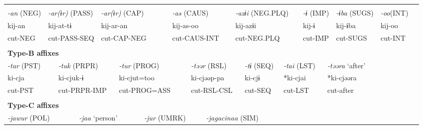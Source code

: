 \tabletail{}
\tablelasttail{}
\begin{tabularx}{\textwidth}{XXXXXXXXXXXXXXXXXXXXXX}
\lsptoprule
\multicolumn{22}{X}{{\bfseries Type-A affixes}}\\
{ \textit{{}-an} (NEG)} & \multicolumn{4}{X}{{ \textit{{}-ar(ɨr)} (PASS)}} & \multicolumn{4}{X}{{ \textit{{}-ar(ɨr)} (CAP)}} & \multicolumn{4}{X}{{ \textit{{}-as} (CAUS)}} & \multicolumn{4}{X}{{ \textit{{}-azɨi} (NEG.PLQ)}} & \multicolumn{2}{X}{{ \textit{{}-ɨ} (IMP)}} & { \textit{{}-ɨba} (SUGS)} & { \textit{{}-oo}(INT)} & \\
{ kij-an} & \multicolumn{4}{X}{{ kij-at-tɨ}} & \multicolumn{4}{X}{{ kij-ar-an}} & \multicolumn{4}{X}{{ kij-as-oo}} & \multicolumn{4}{X}{{ kij-azɨi}} & \multicolumn{2}{X}{{ kij-ɨ}} & { kij-ɨba} & { kij-oo} & \\
cut-NEG & \multicolumn{4}{X}{cut-PASS-SEQ} & \multicolumn{4}{X}{cut-CAP-NEG} & \multicolumn{4}{X}{cut-CAUS-INT} & \multicolumn{4}{X}{cut-NEG.PLQ} & \multicolumn{2}{X}{cut-IMP} & cut-SUGS & cut-INT & \\
\multicolumn{22}{X}{}\\
\multicolumn{22}{X}{{\bfseries Type-B affixes}}\\
\multicolumn{2}{X}{{ \textit{{}-tar} (PST)}} & \multicolumn{4}{X}{{ \textit{{}-tuk} (PRPR)}} & \multicolumn{4}{X}{{ \textit{{}-tur} (PROG)}} & \multicolumn{4}{X}{{ \textit{{}-təər} (RSL)}} & \multicolumn{2}{X}{{ \textit{{}-tɨ} (SEQ)}} & \multicolumn{2}{X}{{ \textit{{}-tai} (LST)}} & \multicolumn{4}{X}{{ \textit{{}-təəra} ‘after’}}\\
\multicolumn{2}{X}{{ ki-cja}} & \multicolumn{4}{X}{{ ki-cjuk-ɨ}} & \multicolumn{4}{X}{{ ki-cjut=too}} & \multicolumn{4}{X}{{ ki-cjəəp-pa}} & \multicolumn{2}{X}{{ ki-cjɨ}} & \multicolumn{2}{X}{{ *ki-cjai}} & \multicolumn{4}{X}{{ *ki-cjəəra}}\\
\multicolumn{2}{X}{cut-PST} & \multicolumn{4}{X}{cut-PRPR-IMP} & \multicolumn{4}{X}{cut-PROG=ASS} & \multicolumn{4}{X}{cut-RSL-CSL} & \multicolumn{2}{X}{cut-SEQ} & \multicolumn{2}{X}{cut-LST} & \multicolumn{4}{X}{{ cut-after}}\\
\multicolumn{2}{X}{} & \multicolumn{4}{X}{} & \multicolumn{4}{X}{} & \multicolumn{4}{X}{} & \multicolumn{2}{X}{} & \multicolumn{2}{X}{} & \multicolumn{4}{X}{}\\
\multicolumn{22}{X}{{\bfseries Type-C affixes}}\\
\multicolumn{4}{X}{{ \textit{{}-jawur} (POL)}} & \multicolumn{3}{X}{{ \textit{{}-jaa} ‘person’}} & \multicolumn{4}{X}{{ \textit{{}-jur} (UMRK)}} & \multicolumn{4}{X}{{ \textit{{}-jagacinaa} (SIM)}} & \multicolumn{7}{X}{}\\

\end{tabularx}
